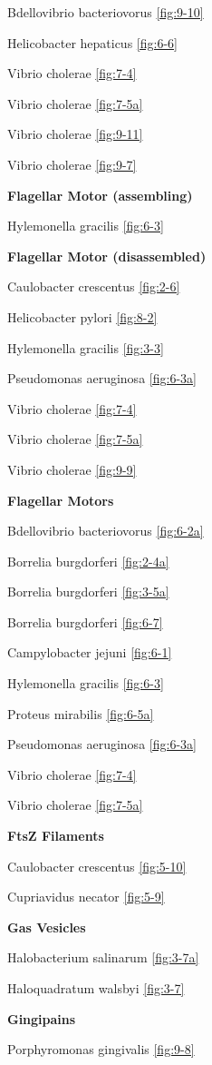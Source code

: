 \documentclass[]{tufte-book}
\begin{document}
Bdellovibrio bacteriovorus \ref{fig:9-10}

Helicobacter hepaticus \ref{fig:6-6}

Vibrio cholerae \ref{fig:7-4}

Vibrio cholerae \ref{fig:7-5a}

Vibrio cholerae \ref{fig:9-11}

Vibrio cholerae \ref{fig:9-7}

\textbf{Flagellar Motor (assembling)}

Hylemonella gracilis \ref{fig:6-3}

\textbf{Flagellar Motor (disassembled)}

Caulobacter crescentus \ref{fig:2-6}

Helicobacter pylori \ref{fig:8-2}

Hylemonella gracilis \ref{fig:3-3}

Pseudomonas aeruginosa \ref{fig:6-3a}

Vibrio cholerae \ref{fig:7-4}

Vibrio cholerae \ref{fig:7-5a}

Vibrio cholerae \ref{fig:9-9}

\textbf{Flagellar Motors}

Bdellovibrio bacteriovorus \ref{fig:6-2a}

Borrelia burgdorferi \ref{fig:2-4a}

Borrelia burgdorferi \ref{fig:3-5a}

Borrelia burgdorferi \ref{fig:6-7}

Campylobacter jejuni \ref{fig:6-1}

Hylemonella gracilis \ref{fig:6-3}

Proteus mirabilis \ref{fig:6-5a}

Pseudomonas aeruginosa \ref{fig:6-3a}

Vibrio cholerae \ref{fig:7-4}

Vibrio cholerae \ref{fig:7-5a}

\textbf{FtsZ Filaments}

Caulobacter crescentus \ref{fig:5-10}

Cupriavidus necator \ref{fig:5-9}

\textbf{Gas Vesicles}

Halobacterium salinarum \ref{fig:3-7a}

Haloquadratum walsbyi \ref{fig:3-7}

\textbf{Gingipains}

Porphyromonas gingivalis \ref{fig:9-8}
\end{document}
